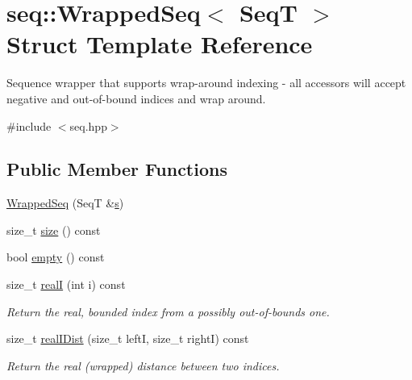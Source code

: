 \hypertarget{structseq_1_1_wrapped_seq}{\section{seq\-:\-:Wrapped\-Seq$<$ Seq\-T $>$ Struct Template Reference}
\label{structseq_1_1_wrapped_seq}
}


Sequence wrapper that supports wrap-\/around indexing -\/ all accessors will accept negative and out-\/of-\/bound indices and wrap around.  




{\ttfamily \#include $<$seq.\-hpp$>$}

\subsection*{Public Member Functions}
\begin{DoxyCompactItemize}
\item 
\hyperlink{structseq_1_1_wrapped_seq_aeb07ecb3ae54bc7460405d3f95098bcd}{Wrapped\-Seq} (Seq\-T \&\hyperlink{structseq_1_1_wrapped_seq_a838d548016ce08b745cb29dbee635437}{s})
\item 
size\-\_\-t \hyperlink{structseq_1_1_wrapped_seq_ab892f134a58400cc8a8ae32a2dabb7c4}{size} () const 
\item 
bool \hyperlink{structseq_1_1_wrapped_seq_abef397e7335e8705520777284326fe23}{empty} () const 
\item 
size\-\_\-t \hyperlink{structseq_1_1_wrapped_seq_a0259bb6a1a44a68e4dbda5b37750f503}{real\-I} (int i) const 
\begin{DoxyCompactList}\small\item\em Return the real, bounded index from a possibly out-\/of-\/bounds one. \end{DoxyCompactList}\item 
size\-\_\-t \hyperlink{structseq_1_1_wrapped_seq_a2b929ec2f56c92a9b2269f1853e4cd10}{real\-I\-Dist} (size\-\_\-t left\-I, size\-\_\-t right\-I) const 
\begin{DoxyCompactList}\small\item\em Return the real (wrapped) distance between two indices. \end{DoxyCompactList}\end{DoxyCompactItemize}
{\bf }\par
